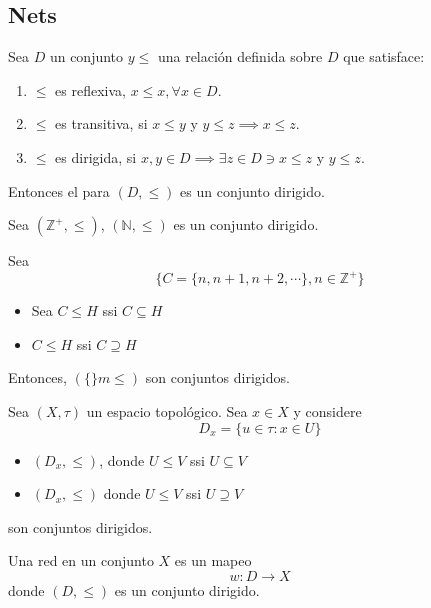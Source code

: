 \subsection{Nets}

\begin{dem}
    Sea $D$ un conjunto $y\leq$ una relación definida sobre $D$ que satisface: 
    \begin{enumerate}
        \item $\leq$ es reflexiva, $x\leq x,\forall x\in D$. 
        \item $\leq$ es transitiva, si $x\leq y$ y $y\leq z\implies x\leq z$. 
        \item $\leq$ es dirigida, si $x,y\in D\implies \exists z\in D\ni x\leq z$ y $y\leq z$.  
    \end{enumerate}
    Entonces el para $(D,\leq)$ es un conjunto dirigido. 
\end{dem}

\begin{ejemplo}
    Sea $(\mathbb{Z}^+,\leq)$, $(\mathbb{N},\leq)$ es un conjunto dirigido. 
\end{ejemplo}

\begin{ejemplo}
    Sea $$\{C=\{ n,n+1,n+2, \cdots\}, n\in \mathbb{Z}^+\}$$
    \begin{itemize}
        \item Sea $C\leq H$ ssi $C\subseteq H$
        \item $C\leq H$ ssi $C\supseteq H$
    \end{itemize}
     Entonces, $(\{\}m \leq )$ son conjuntos dirigidos.
\end{ejemplo}

\begin{ejemplo}
    Sea $(X,\tau)$ un espacio topológico. Sea $x\in X$ y considere 
$$D_x=\{u\in \tau: x\in U\}$$

\begin{itemize}
    \item $(D_x,\leq)$, donde $U\leq V$ ssi $U\subseteq V$
    \item $(D_x,\leq)$ donde $U\leq V$ ssi $U\supseteq V$
\end{itemize}
son conjuntos dirigidos.
\end{ejemplo}


\begin{definicion}
    Una red en un conjunto $X$ es un mapeo 
    $$w:D\to X$$
    donde $(D,\leq)$ es un conjunto dirigido.  
\end{definicion}

